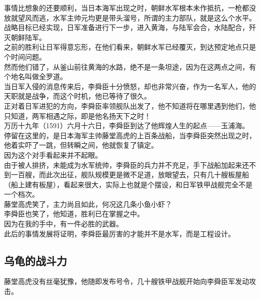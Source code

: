 \begin{multicols}{\theparacolNo}
事情比想象的还要顺利，当日本海军出现之时，朝鲜水军根本未作抵抗，一枪都没放就望风而逃，水军主帅元均更是带头溜号，所谓的主力部队，就是这么个水平。\\

战略目标已经实现，日军准备进行下一步，进入黄海，与陆军会合，水陆配合，歼灭朝鲜陆军。\\

之前的胜利让日军得意忘形，在他们看来，朝鲜水军已经覆灭，到达预定地点只是个时间问题。\\

然而他们错了，从釜山前往黄海的水路，绝不是一条坦途，因为在这两点之间，有个地名叫做全罗道。\\

当日军入侵的消息传来后，李舜臣十分愤怒，却也非常兴奋，作为一名军人，他的天职就是战争，而这个时机，他已等待了很久。\\

正对着日军进犯的方向，李舜臣率领舰队出发了，他不知道将在哪里遇到他们，他只知道，两军相遇之际，即是他名扬天下之时！\\

万历十九年（1591）六月十六日，李舜臣到达了他辉煌人生的起点——玉浦海。\\

停留在这里的，是日本海军主帅藤堂高虎的上百条战船，当李舜臣突然出现之时，他着实吓了一跳，但转瞬之间，他就恢复了镇定。\\

因为这个对手看起来并不起眼。\\

由于被人排挤，未能成为水军统帅，李舜臣的兵力并不充足，手下战船加起来还不到一百艘，而此次出征，舰队规模更是微不足道，放眼望去，只有几十艘板屋船（船上建有板屋），看起来很大，实际上也就是个摆设，和日军铁甲战舰完全不是一个档次。\\

藤堂高虎笑了，主力尚且如此，何况这几条小鱼小虾？\\

李舜臣也笑了，他知道，胜利已在掌握之中。\\

因为在我的手中，有一件必胜的武器。\\

此后的事情发展将证明，李舜臣最厉害的才能并不是水军，而是工程设计。\\

\subsection{乌龟的战斗力}
藤堂高虎没有丝毫犹豫，他随即发布号令，几十艘铁甲战舰开始向李舜臣军发动攻击。\\


\end{multicols}
